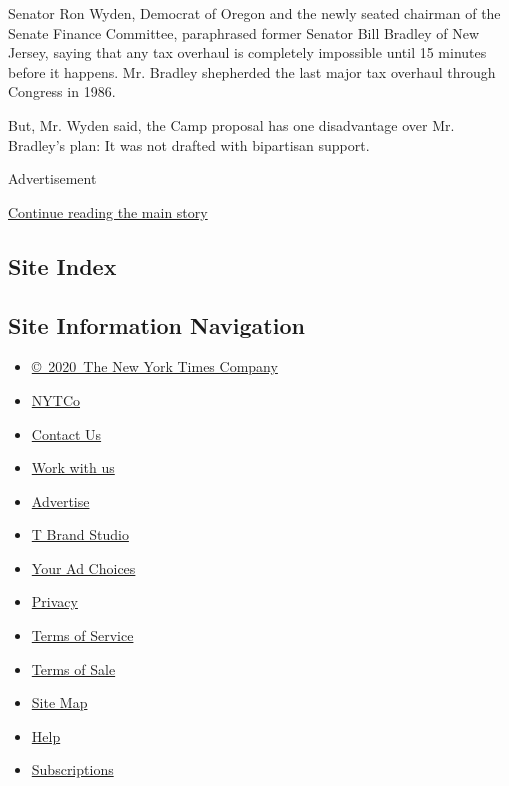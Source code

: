 Senator Ron Wyden, Democrat of Oregon and the newly seated chairman of
the Senate Finance Committee, paraphrased former Senator Bill Bradley of
New Jersey, saying that any tax overhaul is completely impossible until
15 minutes before it happens. Mr. Bradley shepherded the last major tax
overhaul through Congress in 1986.

But, Mr. Wyden said, the Camp proposal has one disadvantage over Mr.
Bradley's plan: It was not drafted with bipartisan support.

Advertisement

\protect\hyperlink{after-bottom}{Continue reading the main story}

\hypertarget{site-index}{%
\subsection{Site Index}\label{site-index}}

\hypertarget{site-information-navigation}{%
\subsection{Site Information
Navigation}\label{site-information-navigation}}

\begin{itemize}
\tightlist
\item
  \href{https://help.nytimes.com/hc/en-us/articles/115014792127-Copyright-notice}{©~2020~The
  New York Times Company}
\end{itemize}

\begin{itemize}
\tightlist
\item
  \href{https://www.nytco.com/}{NYTCo}
\item
  \href{https://help.nytimes.com/hc/en-us/articles/115015385887-Contact-Us}{Contact
  Us}
\item
  \href{https://www.nytco.com/careers/}{Work with us}
\item
  \href{https://nytmediakit.com/}{Advertise}
\item
  \href{http://www.tbrandstudio.com/}{T Brand Studio}
\item
  \href{https://www.nytimes.com/privacy/cookie-policy\#how-do-i-manage-trackers}{Your
  Ad Choices}
\item
  \href{https://www.nytimes.com/privacy}{Privacy}
\item
  \href{https://help.nytimes.com/hc/en-us/articles/115014893428-Terms-of-service}{Terms
  of Service}
\item
  \href{https://help.nytimes.com/hc/en-us/articles/115014893968-Terms-of-sale}{Terms
  of Sale}
\item
  \href{https://spiderbites.nytimes.com}{Site Map}
\item
  \href{https://help.nytimes.com/hc/en-us}{Help}
\item
  \href{https://www.nytimes.com/subscription?campaignId=37WXW}{Subscriptions}
\end{itemize}
